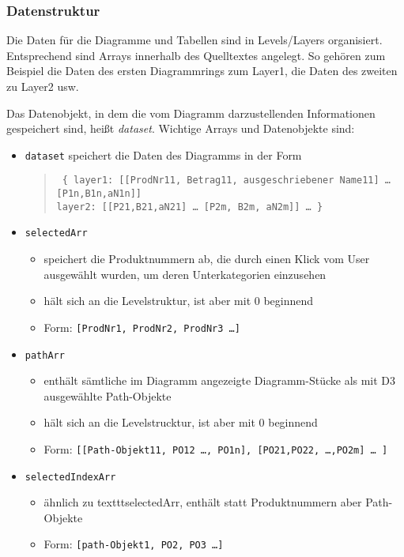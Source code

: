 \documentclass[a4paper,11pt,twoside]{article}
\begin{document}
\subsubsection{Datenstruktur}
Die Daten für die Diagramme und Tabellen sind in Levels/Layers organisiert.
Entsprechend sind Arrays innerhalb des Quelltextes angelegt. So gehören zum
Beispiel die Daten des ersten Diagrammrings zum Layer1, die Daten des zweiten
zu Layer2 usw.

Das Datenobjekt, in dem die vom Diagramm darzustellenden Informationen
gespeichert sind, heißt \emph{dataset}.  Wichtige Arrays und Datenobjekte
sind:
\begin{itemize}
\item \texttt{dataset} speichert die Daten des Diagramms in der Form
  \begin{quote}\tt
    \{ layer1: [[ProdNr11, Betrag11, ausgeschriebener Name11] {\ldots}\\{}
      [P1n,B1n,aN1n]]\\ layer2: [[P21,B21,aN21] {\ldots} [P2m, B2m, aN2m]]
       {\ldots} \}
  \end{quote}
\item \texttt{selectedArr} 
  \begin{itemize}
  \item speichert die Produktnummern ab, die durch einen Klick vom User
    ausgewählt wurden, um deren Unterkategorien einzusehen
  \item hält sich an die Levelstruktur, ist aber mit 0 beginnend
  \item Form: \texttt{[ProdNr1, ProdNr2, ProdNr3 {\ldots}]}
  \end{itemize}
\item \texttt{pathArr} 
  \begin{itemize}
  \item enthält sämtliche im Diagramm angezeigte Diagramm-Stücke als mit D3
    ausgewählte Path-Objekte 
  \item hält sich an die Levelstrucktur, ist aber mit 0 beginnend
  \item Form: \texttt{[[Path-Objekt11, PO12 {\ldots}, PO1n], [PO21,PO22,
        {\ldots},PO2m] {\ldots} ]}
  \end{itemize}
\item \texttt{selectedIndexArr}
  \begin{itemize}
  \item ähnlich zu texttt{selectedArr}, enthält statt Produktnummern aber
    Path-Objekte
  \item Form: \texttt{[path-Objekt1, PO2, PO3 {\ldots}]}
  \end{itemize}
\end{itemize}
\end{document}
